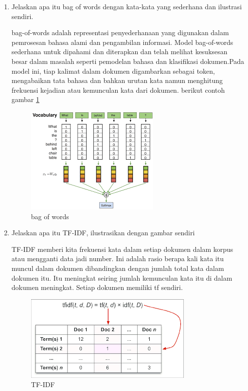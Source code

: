 \begin{enumerate}
\item Jelaskan apa itu bag of words dengan kata-kata yang sederhana dan ilustrasi sendiri.
\par bag-of-words adalah representasi penyederhanaan yang digunakan dalam pemrosesan bahasa alami dan pengambilan informasi. Model bag-of-words sederhana untuk dipahami dan diterapkan dan telah melihat kesuksesan besar dalam masalah seperti pemodelan bahasa dan klasiﬁkasi dokumen.Pada model ini, tiap kalimat dalam dokumen digambarkan sebagai token, mengabaikan tata bahasa dan bahkan urutan kata namun menghitung frekuensi kejadian atau kemunculan kata dari dokumen. berikut contoh gambar \ref{bag of words}
\begin{figure}[H]
\centering
\includegraphics[scale=0.5]{figures/1174012/chapter4/4.png}
\caption{bag of words}
\label{bag of words}
\end{figure}

\item Jelaskan apa itu TF-IDF, ilustrasikan dengan gambar sendiri
\par TF-IDF memberi kita frekuensi kata dalam setiap dokumen dalam korpus atau mengganti data jadi number. Ini adalah rasio berapa kali kata itu muncul dalam dokumen dibandingkan dengan jumlah total kata dalam dokumen itu. Itu meningkat seiring jumlah kemunculan kata itu di dalam dokumen meningkat. Setiap dokumen memiliki tf sendiri.
\begin{figure}[H]
\centering
\includegraphics[scale=0.6]{figures/1174012/chapter4/5.PNG}
\caption{TF-IDF}
\label{TF-IDF}
\end{figure}

\end{enumerate}

